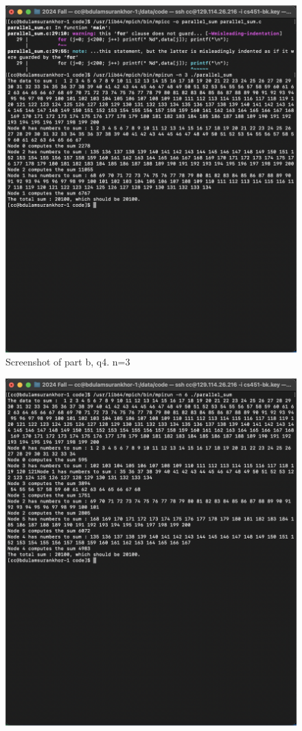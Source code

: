 \documentclass{article}
\begin{document}
\begin{enumerate}
\begin{enumerate}
\begin{enumerate}
\begin{figure}[H]
        \includegraphics[width=\textwidth]{image13.png}
        \caption{Screenshot of part b, q4. n=3}
      \end{figure}
      \begin{figure}[H]
        \centering
        \includegraphics[width=\textwidth]{image14.png}

\end{figure}
\end{enumerate}
\end{enumerate}
\end{enumerate}
\end{document}
